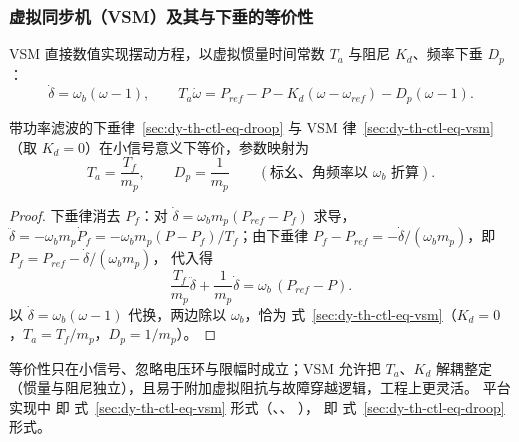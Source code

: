 \subsubsection{虚拟同步机（VSM）及其与下垂的等价性}

\begin{definition}\label{sec:dy-th-ctl-def-vsm}
VSM 直接数值实现摆动方程，以虚拟惯量时间常数 $T_a$ 与阻尼 $K_d$、频率下垂
$D_p$：
\begin{equation}
\dot\delta=\omega_b(\omega-1),\qquad
T_a\dot\omega=P_{ref}-P-K_d(\omega-\omega_{ref})-D_p(\omega-1).
\label{sec:dy-th-ctl-eq-vsm}
\end{equation}
\end{definition}

\begin{proposition}\label{sec:dy-th-ctl-prop-equiv}
带功率滤波的下垂律~\eqref{sec:dy-th-ctl-eq-droop} 与 VSM
律~\eqref{sec:dy-th-ctl-eq-vsm}（取 $K_d=0$）在小信号意义下等价，参数映射为
\begin{equation}
T_a=\frac{T_f}{m_p},\qquad D_p=\frac{1}{m_p}
\qquad(\text{标幺、角频率以 }\omega_b\text{ 折算}).
\label{sec:dy-th-ctl-eq-equiv}
\end{equation}
\end{proposition}

\begin{proof}
下垂律消去 $P_f$：对 $\dot\delta=\omega_b m_p(P_{ref}-P_f)$ 求导，
$\ddot\delta=-\omega_b m_p\dot P_f=-\omega_b m_p(P-P_f)/T_f$；由下垂律
$P_f-P_{ref}=-\dot\delta/(\omega_b m_p)$，即 $P_f=P_{ref}-\dot\delta/(\omega_b m_p)$，
代入得
\begin{equation}
\frac{T_f}{m_p}\ddot\delta+\frac{1}{m_p}\dot\delta=\omega_b\,(P_{ref}-P).
\end{equation}
以 $\dot\delta=\omega_b(\omega-1)$ 代换，两边除以 $\omega_b$，恰为
式~\eqref{sec:dy-th-ctl-eq-vsm}（$K_d=0$，$T_a=T_f/m_p$，$D_p=1/m_p$）。
\end{proof}

\begin{remark}
等价性只在小信号、忽略电压环与限幅时成立；VSM 允许把 $T_a$、$K_d$ 解耦整定
（惯量与阻尼独立），且易于附加虚拟阻抗与故障穿越逻辑，工程上更灵活。
平台实现中  即
式~\eqref{sec:dy-th-ctl-eq-vsm} 形式（、、
）， 即
式~\eqref{sec:dy-th-ctl-eq-droop} 形式。
\end{remark}


